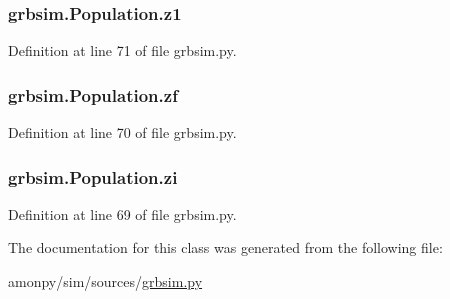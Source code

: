 \hypertarget{classgrbsim_1_1_population_a2d1535d9af34a3e9355d05734e1d7c94}{
\subsubsection[{z1}]{\setlength{\rightskip}{0pt plus 5cm}grbsim.\-Population.\-z1}}\label{classgrbsim_1_1_population_a2d1535d9af34a3e9355d05734e1d7c94}


Definition at line 71 of file grbsim.\-py.

\hypertarget{classgrbsim_1_1_population_ac6613ab254b2366c6fac7ba50e4734d7}{
\subsubsection[{zf}]{\setlength{\rightskip}{0pt plus 5cm}grbsim.\-Population.\-zf}}\label{classgrbsim_1_1_population_ac6613ab254b2366c6fac7ba50e4734d7}


Definition at line 70 of file grbsim.\-py.

\hypertarget{classgrbsim_1_1_population_a7780a80e30452b2a4682f7b6f2bf0d18}{
\subsubsection[{zi}]{\setlength{\rightskip}{0pt plus 5cm}grbsim.\-Population.\-zi}}\label{classgrbsim_1_1_population_a7780a80e30452b2a4682f7b6f2bf0d18}


Definition at line 69 of file grbsim.\-py.



The documentation for this class was generated from the following file\-:\begin{DoxyCompactItemize}
\item 
amonpy/sim/sources/\hyperlink{grbsim_8py}{grbsim.\-py}\end{DoxyCompactItemize}

